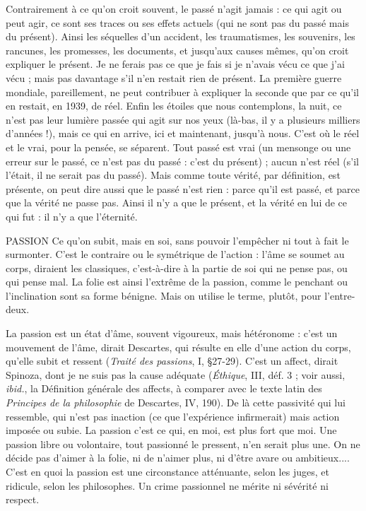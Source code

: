 Contrairement à ce qu’on croit souvent, le passé n’agit jamais : ce qui agit
ou peut agir, ce sont ses traces ou ses effets actuels (qui ne sont pas du passé
mais du présent). Ainsi les séquelles d’un accident, les traumatismes, les souvenirs,
les rancunes, les promesses, les documents, et jusqu'aux causes
mêmes, qu'on croit expliquer le présent. Je ne ferais pas ce que je fais si je
n'avais vécu ce que j'ai vécu ; mais pas davantage s’il n’en restait rien de présent.
La première guerre mondiale, pareillement, ne peut contribuer à expliquer
la seconde que par ce qu’il en restait, en 1939, de réel. Enfin les étoiles
que nous contemplons, la nuit, ce n’est pas leur lumière passée qui agit sur
nos yeux (là-bas, il y a plusieurs milliers d'années !), mais ce qui en arrive, ici
et maintenant, jusqu’à nous. C’est où le réel et le vrai, pour la pensée, se séparent.
Tout passé est vrai (un mensonge ou une erreur sur le passé, ce n’est pas
du passé : c’est du présent) ; aucun n’est réel (s’il l'était, il ne serait pas du
passé). Mais comme toute vérité, par définition, est présente, on peut dire
aussi que le passé n’est rien : parce qu’il est passé, et parce que la vérité ne
passe pas. Ainsi il n’y a que le présent, et la vérité en lui de ce qui fut : il n’y
a que l'éternité.

PASSION Ce qu’on subit, mais en soi, sans pouvoir l'empêcher ni tout à fait
le surmonter. C’est le contraire ou le symétrique de l’action :
l’âme se soumet au corps, diraient les classiques, c’est-à-dire à la partie de soi
qui ne pense pas, ou qui pense mal. La folie est ainsi l'extrême de la passion,
comme le penchant ou l’inclination sont sa forme bénigne. Mais on utilise le
terme, plutôt, pour l’entre-deux.

La passion est un état d'âme, souvent vigoureux, mais hétéronome : c’est
un mouvement de l’âme, dirait Descartes, qui résulte en elle d’une action du
corps, qu’elle subit et ressent ({\it Traité des passions}, I, \S 27-29). C’est un affect,
dirait Spinoza, dont je ne suis pas la cause adéquate ({\it Éthique}, III, déf. 3 ; voir
aussi, {\it ibid.}, la Définition générale des affects, à comparer avec le texte latin des
{\it Principes de la philosophie} de Descartes, IV, 190). De là cette passivité qui lui
ressemble, qui n’est pas inaction (ce que l’expérience infirmerait) mais action
imposée ou subie. La passion c’est ce qui, en moi, est plus fort que moi. Une
passion libre ou volontaire, tout passionné le pressent, n’en serait plus une. On
ne décide pas d’aimer à la folie, ni de n’aimer plus, ni d’être avare ou ambitieux....
C’est en quoi la passion est une circonstance atténuante, selon les
juges, et ridicule, selon les philosophes. Un crime passionnel ne mérite ni sévérité
ni respect.

